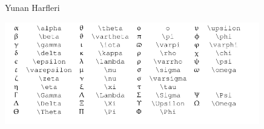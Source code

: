 \documentclass[12pt,fleqn]{article}\usepackage{../../common}
\begin{document}
Yunan Harfleri

\includegraphics[width=30em]{../../algs/algs_999_zapp/letters.png}
\end{document}
